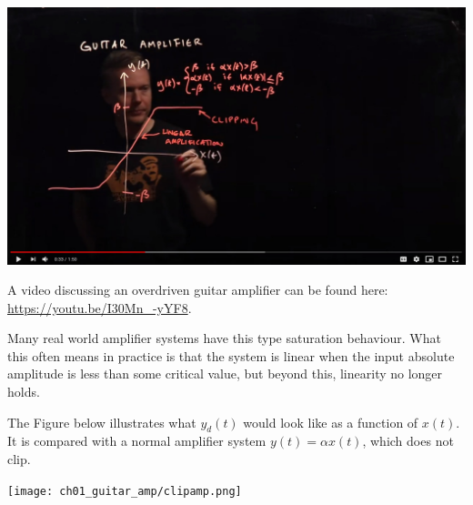 \begin{marginfigure}
  \begin{center}
    \includegraphics[width=\textwidth]{ch04/figures/ampvid.jpg}
  \end{center}
  \caption{A video discussing an overdriven guitar amplifier can be found here: \url{https://youtu.be/I30Mn_-yYF8}.}
\end{marginfigure}
Many real world amplifier systems have this type saturation
behaviour. What this often means in practice is that the system is
linear when the input absolute amplitude is less than some critical
value, but beyond this, linearity no longer holds.

The Figure below illustrates what $y_d(t)$ would look like as a
function of $x(t)$. It is compared with a normal amplifier system
$y(t)=\alpha x(t)$, which does not clip.

\begin{center}
\texttt{[image: ch01\_guitar\_amp/clipamp.png]}
\end{center}
\fi
